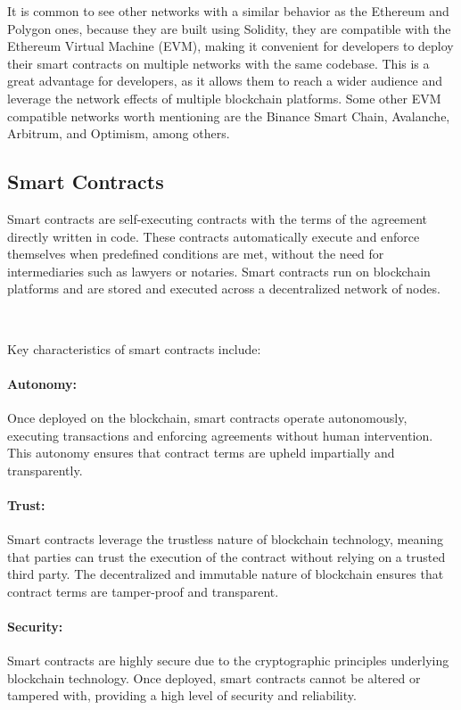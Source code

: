 It is common to see other networks with a similar behavior as the Ethereum and Polygon ones, because they are built using Solidity, they are compatible with the Ethereum Virtual Machine (EVM), making it convenient for developers to deploy their smart contracts on multiple networks with the same codebase. This is a great advantage for developers, as it allows them to reach a wider audience and leverage the network effects of multiple blockchain platforms. Some other EVM compatible networks worth mentioning are the Binance Smart Chain, Avalanche, Arbitrum, and Optimism, among others.

\subsection{Smart Contracts}
\label{subsec:smart_contracts}

Smart contracts are self-executing contracts with the terms of the agreement directly written in code. These contracts automatically execute and enforce themselves when predefined conditions are met, without the need for intermediaries such as lawyers or notaries. Smart contracts run on blockchain platforms and are stored and executed across a decentralized network of nodes.

~

Key characteristics of smart contracts include:

\paragraph{Autonomy:}
Once deployed on the blockchain, smart contracts operate autonomously, executing transactions and enforcing agreements without human intervention. This autonomy ensures that contract terms are upheld impartially and transparently.

\paragraph{Trust:}
Smart contracts leverage the trustless nature of blockchain technology, meaning that parties can trust the execution of the contract without relying on a trusted third party. The decentralized and immutable nature of blockchain ensures that contract terms are tamper-proof and transparent.

\paragraph{Security:}
Smart contracts are highly secure due to the cryptographic principles underlying blockchain technology. Once deployed, smart contracts cannot be altered or tampered with, providing a high level of security and reliability.

